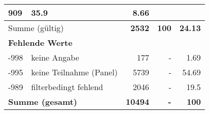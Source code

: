 \begin{longtable}{lXrrr}
       \num{909} &
       \num[round-mode=places,round-precision=2]{35,9} &
         \num[round-mode=places,round-precision=2]{8,66} \\
     \midrule
     \multicolumn{2}{l}{Summe (gültig)} &
       \textbf{\num{2532}} &
     \textbf{100} &
       \textbf{\num[round-mode=places,round-precision=2]{24,13}} \\
     \multicolumn{5}{l}{\textbf{Fehlende Werte}}\\
       -998 &
       keine Angabe &
         \num{177} &
        - &
         \num[round-mode=places,round-precision=2]{1,69} \\
       -995 &
       keine Teilnahme (Panel) &
         \num{5739} &
        - &
         \num[round-mode=places,round-precision=2]{54,69} \\
       -989 &
       filterbedingt fehlend &
         \num{2046} &
        - &
         \num[round-mode=places,round-precision=2]{19,5} \\
     \midrule
     \multicolumn{2}{l}{\textbf{Summe (gesamt)}} &
          \textbf{\num{10494}} &
        \textbf{-} &
        \textbf{100} \\
     \bottomrule
     \end{longtable}
     

